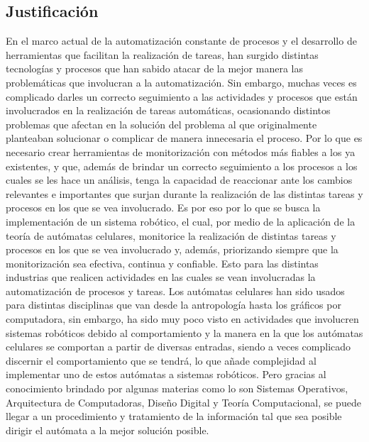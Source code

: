 \subsection{Justificaci\'on}
\label{sec-1-1-2}

    En el marco actual de la automatizaci\'on constante de procesos y el desarrollo de herramientas que facilitan la
        realizaci\'on de tareas, han surgido distintas tecnolog\'ias y procesos que han sabido atacar de la mejor manera las
        problem\'aticas que involucran a la automatizaci\'on. Sin embargo, muchas veces es complicado darles un correcto
        seguimiento a las actividades y procesos que est\'an involucrados en la realizaci\'on de tareas autom\'aticas,
        ocasionando distintos problemas que afectan en la soluci\'on del problema al que originalmente planteaban
        solucionar o complicar de manera innecesaria el proceso. Por lo que es necesario crear herramientas de
        monitorizaci\'on con m\'etodos m\'as fiables a los ya existentes, y que, adem\'as de brindar un correcto seguimiento
        a los procesos a los cuales se les hace un an\'alisis, tenga la capacidad de reaccionar ante los cambios relevantes
        e importantes que surjan durante la realizaci\'on de las distintas tareas y procesos en los que se vea involucrado.
\vskip 0.5cm
    Es por eso por lo que se busca la implementaci\'on de un sistema rob\'otico, el cual, por medio de la aplicaci\'on de
        la teor\'ia de aut\'omatas celulares, monitorice la realizaci\'on de distintas tareas y procesos en los que se vea
        involucrado y, adem\'as, priorizando siempre que la monitorizaci\'on sea efectiva, continua y confiable. Esto para
        las distintas industrias que realicen actividades en las cuales se vean involucradas la automatizaci\'on de procesos
        y tareas.
\vskip 0.5cm
    Los aut\'omatas celulares han sido usados para distintas disciplinas que van desde la antropolog\'ia hasta los
        gr\'aficos por computadora, sin embargo, ha sido muy poco visto en actividades que involucren sistemas
        rob\'oticos debido al comportamiento y la manera en la que los aut\'omatas celulares se comportan a partir de
        diversas entradas, siendo a veces complicado discernir el comportamiento que se tendr\'a, lo que a\~nade
        complejidad al implementar uno de estos aut\'omatas a sistemas rob\'oticos. Pero gracias al conocimiento brindado
        por algunas materias como lo son Sistemas Operativos, Arquitectura de Computadoras, Dise\~no Digital y Teor\'ia
        Computacional, se puede llegar a un procedimiento y tratamiento de la informaci\'on tal que sea posible dirigir
        el aut\'omata a la mejor soluci\'on posible.